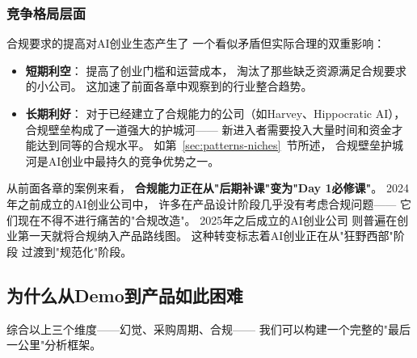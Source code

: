 \subsubsection{竞争格局层面}
合规要求的提高对AI创业生态产生了
一个看似矛盾但实际合理的双重影响：
\begin{itemize}
  \item \textbf{短期利空}：
    提高了创业门槛和运营成本，
    淘汰了那些缺乏资源满足合规要求的小公司。
    这加速了前面各章中观察到的行业整合趋势。
  \item \textbf{长期利好}：
    对于已经建立了合规能力的公司（如Harvey、Hippocratic AI），
    合规壁垒构成了一道强大的护城河——
    新进入者需要投入大量时间和资金才能达到同等的合规水平。
    如第~\ref{sec:patterns-niches}~节所述，
    合规壁垒护城河是AI创业中最持久的竞争优势之一。
\end{itemize}

从前面各章的案例来看，
\textbf{合规能力正在从"后期补课"变为"Day 1必修课"}。
2024年之前成立的AI创业公司中，
许多在产品设计阶段几乎没有考虑合规问题——
它们现在不得不进行痛苦的"合规改造"。
2025年之后成立的AI创业公司
则普遍在创业第一天就将合规纳入产品路线图。
这种转变标志着AI创业正在从"狂野西部"阶段
过渡到"规范化"阶段。


\subsection{为什么从Demo到产品如此困难}

综合以上三个维度——幻觉、采购周期、合规——
我们可以构建一个完整的"最后一公里"分析框架。


